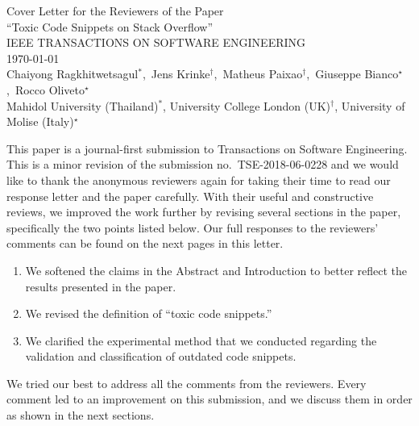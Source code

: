 \documentclass[a4paper,twoside,10pt]{reviewresponse}
\newcommand{\myAuthors}{Chaiyong Ragkhitwetsagul$^\ast$,~Jens Krinke$^\dagger$,~Matheus Paixao$^\dagger$,~Giuseppe Bianco$^\star$,~Rocco Oliveto$^\star$}
\newcommand{\myTitle}{Cover Letter for the Reviewers of the Paper \\ ``Toxic Code Snippets on Stack Overflow''}
\newcommand{\myJournal}{IEEE TRANSACTIONS ON SOFTWARE ENGINEERING}
\newcommand{\myDept}{Mahidol University (Thailand)$^\ast$, University College London (UK)$^\dagger$, University of Molise (Italy)$^\star$}
\begin{document}
\thispagestyle{plain}

\begin{center}
 {\LARGE\myTitle} \vspace{0.3cm} \\
 {\large\myJournal} \vspace{0.3cm} \\
 \today \vspace{0.3cm} \\
 \myAuthors \\
 \vspace{0.3cm} 
 \myDept \vspace{1cm}
\end{center}


This paper is a journal-first submission to Transactions on Software
Engineering. This is a minor revision of the submission
no.~TSE-2018-06-0228 and we would like to thank the anonymous reviewers again for
taking their time to read our response letter and the paper carefully. With their useful and
constructive reviews, we improved the work further by revising several sections in the paper, 
specifically the two points listed below. Our full responses to the reviewers' comments can be found on the next pages in this letter.

\begin{enumerate}
	\item We softened the claims in the Abstract and Introduction to better reflect the results presented in the paper.
	\item We revised the definition of ``toxic code snippets.''
	\item We clarified the experimental method that we conducted regarding the validation and classification of outdated code snippets.
\end{enumerate}

We tried our best to address all the comments from the reviewers. Every
comment led to an improvement on this submission, and we discuss them in order as
shown in the next sections.

\end{document}
